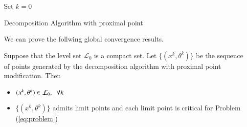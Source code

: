 \begin{algorithm}[ht]
 Set $k = 0$\\
 \caption{Decomposition Algorithm with proximal point}
\end{algorithm}
We can prove the follwing global convergence results.
\begin{proposition}
Suppose that the level set $\mathcal{L}_0$ is a compact set. Let $\{(x^k, \theta^k)\}$ be the sequence of points generated by the decomposition algorithm with proximal point modification. Then
\begin{itemize}
\item $(x^k, \theta^k) \in \mathcal{L}_0, \enskip \forall k$ 
\item  $\{(x^k, \theta^k)\}$ admits limit points and each limit point is critical for Problem (\ref{eq:problem})
\end{itemize}
\end{proposition}

